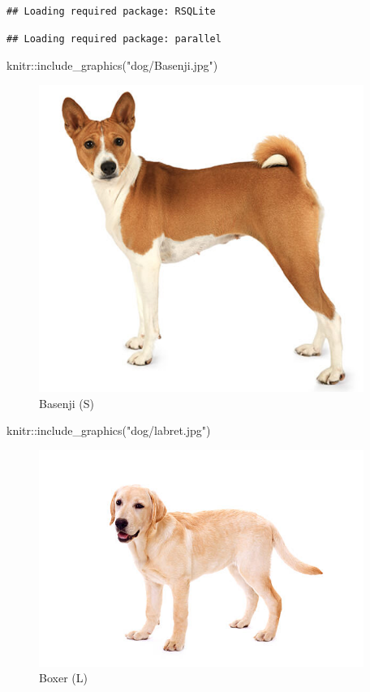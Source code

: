 \documentclass[
]{article}
\newenvironment{Shaded}{\begin{snugshade}}{\end{snugshade}}
\newcommand{\FunctionTok}[1]{\textcolor[rgb]{0.00,0.00,0.00}{#1}}
\newcommand{\NormalTok}[1]{#1}
\newcommand{\SpecialCharTok}[1]{\textcolor[rgb]{0.00,0.00,0.00}{#1}}
\newcommand{\StringTok}[1]{\textcolor[rgb]{0.31,0.60,0.02}{#1}}
\begin{document}
\begin{verbatim}
## Loading required package: RSQLite
\end{verbatim}

\begin{verbatim}
## Loading required package: parallel
\end{verbatim}

\begin{Shaded}
\begin{Highlighting}[]
\NormalTok{knitr}\SpecialCharTok{::}\FunctionTok{include\_graphics}\NormalTok{(}\StringTok{"dog/Basenji.jpg"}\NormalTok{)}
\end{Highlighting}
\end{Shaded}

\begin{figure}
\includegraphics[width=400px]{dog/Basenji} \caption{Basenji (S)}\label{fig:unnamed-chunk-2-1}
\end{figure}

\begin{Shaded}
\begin{Highlighting}[]
\NormalTok{knitr}\SpecialCharTok{::}\FunctionTok{include\_graphics}\NormalTok{(}\StringTok{"dog/labret.jpg"}\NormalTok{)}
\end{Highlighting}
\end{Shaded}

\begin{figure}
\includegraphics[width=400px]{dog/labret} \caption{Boxer (L)}\label{fig:unnamed-chunk-2-2}
\end{figure}
\end{document}
